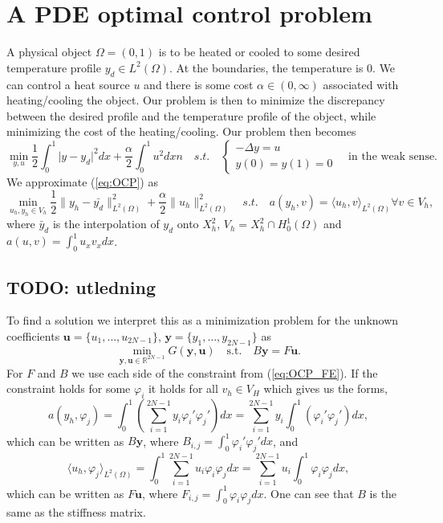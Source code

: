 \section{A PDE optimal control problem}
A physical object $\Omega = (0, 1)$ is to be heated or cooled to some desired temperature profile $y_d \in L^2 (\Omega)$. At the boundaries, the temperature is $0$. 
We can control a heat source $u$ and there is some cost $\alpha \in (0, \infty)$ associated with heating/cooling the object.
Our problem is then to minimize the discrepancy between the desired profile and the temperature profile of the object, while minimizing the cost of the heating/cooling.
Our problem then becomes
\begin{equation}
    \label{eq:OCP}
    \min_{y, u} \frac{1}{2} \int_0^1 \lvert y - y_d \rvert^2 dx + \frac{\alpha}{2}\int_0^1u^2 dxn
    \quad s.t. \quad \begin{cases}
       -\Delta y = u \\
       y(0) = y(1) = 0
    \end{cases} 
    \quad \text{in the weak sense.}
\end{equation}
We approximate (\ref{eq:OCP}) as 
\begin{equation}
    \label{eq:OCP_FE}
    \min_{u_h, y_h \in V_h} \frac{1}{2} \lVert y_h - \bar{y_d} \rVert_ {L^2(\Omega)}^2 + \frac{\alpha}{2} \lVert u_h \rVert_{L^2(\Omega)}^2
    \quad s.t. \quad a(y_h, v) = \langle u_h, v \rangle_{L^2(\Omega)} \forall v \in V_h,
\end{equation}
where $\bar{y}_d$ is the interpolation of $y_d$ onto $X_h^2$, $V_h = X_h^2 \cap H_0^1 (\Omega)$ and $a(u, v) = \int_0^1 u_x v_x dx$.
\subsection{TODO: utledning}
To find a solution we interpret this as a minimization problem for the unknown coefficients $\mathbf{u} = \{u_1, \dots, u_{2N-1} \}$, $\mathbf{y} = \{y_1, \dots, y_{2N-1} \}$ as
\begin{equation}
    \label{eq:OCP_coeff}
    \min_{\mathbf{y,u} \in \mathds{R}^{2N-1}} G(\mathbf{y, u}) \quad \text{s.t.} \quad B\mathbf{y} = F\mathbf{u}.
\end{equation}
For $F$ and $B$ we use each side of the constraint from (\ref{eq:OCP_FE}). If the constraint holds for some $\varphi_i$ it holds for all $v_h\in V_H$ which gives us the forms,
$$a(y_h, \varphi_j) = \int_0^1 \left( \sum_{i=1}^{2N-1} y_i \varphi_i' \varphi_j' \right)dx =\sum_{i=1}^{2N-1} y_i\int_0^1 \left( \varphi_i' \varphi_j' \right)dx,$$
which can be written as $B\mathbf{y}$, where $B_{i,j} = \int_0^1 \varphi_i' \varphi_j'dx$, and  
$$\langle u_h, \varphi_j \rangle_{L^2(\Omega)} = \int_0^1 \sum_{i=1}^{2N-1} u_i \varphi_i \varphi_j dx =\sum_{i=1}^{2N-1} u_i \int_0^1  \varphi_i \varphi_j dx,$$
which can be written as $F\mathbf{u}$, where $F_{i,j}=\int_0^1  \varphi_i \varphi_j dx$.
One can see that $B$ is the same as the stiffness matrix.

